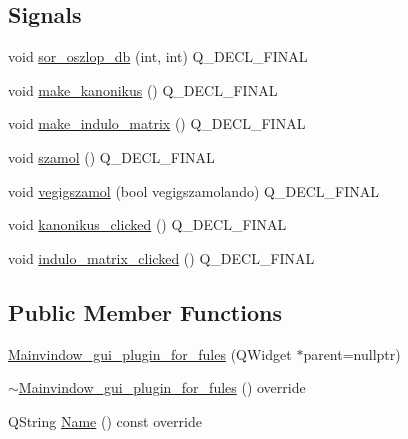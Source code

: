 \subsection*{Signals}
\begin{DoxyCompactItemize}
\item 
void \hyperlink{classMainvindow__gui__plugin__for__fules_a04e1668bac22f62c014954222d19f2ac}{sor\+\_\+oszlop\+\_\+db} (int, int) Q\+\_\+\+D\+E\+C\+L\+\_\+\+F\+I\+N\+AL
\item 
void \hyperlink{classMainvindow__gui__plugin__for__fules_ad57320bcd6e0f8353254601919b980b9}{make\+\_\+kanonikus} () Q\+\_\+\+D\+E\+C\+L\+\_\+\+F\+I\+N\+AL
\item 
void \hyperlink{classMainvindow__gui__plugin__for__fules_a69be0da66c49005cb7178c140b53dccb}{make\+\_\+indulo\+\_\+matrix} () Q\+\_\+\+D\+E\+C\+L\+\_\+\+F\+I\+N\+AL
\item 
void \hyperlink{classMainvindow__gui__plugin__for__fules_ab44bcc45064b346477fef5df26a119cc}{szamol} () Q\+\_\+\+D\+E\+C\+L\+\_\+\+F\+I\+N\+AL
\item 
void \hyperlink{classMainvindow__gui__plugin__for__fules_a080c54bd4e8e65ffcaacad58e900248a}{vegigszamol} (bool vegigszamolando) Q\+\_\+\+D\+E\+C\+L\+\_\+\+F\+I\+N\+AL
\item 
void \hyperlink{classMainvindow__gui__plugin__for__fules_a4ca08e417e9b4784db455ed9016870cc}{kanonikus\+\_\+clicked} () Q\+\_\+\+D\+E\+C\+L\+\_\+\+F\+I\+N\+AL
\item 
void \hyperlink{classMainvindow__gui__plugin__for__fules_a1b7701944f9234161efae2663b5c660f}{indulo\+\_\+matrix\+\_\+clicked} () Q\+\_\+\+D\+E\+C\+L\+\_\+\+F\+I\+N\+AL
\end{DoxyCompactItemize}
\subsection*{Public Member Functions}
\begin{DoxyCompactItemize}
\item 
\hyperlink{classMainvindow__gui__plugin__for__fules_aeb68fbca198b45e19deee3af31e550e5}{Mainvindow\+\_\+gui\+\_\+plugin\+\_\+for\+\_\+fules} (Q\+Widget $\ast$parent=nullptr)
\item 
\hyperlink{classMainvindow__gui__plugin__for__fules_a202c933c2c305081247fb1c334e1a020}{$\sim$\+Mainvindow\+\_\+gui\+\_\+plugin\+\_\+for\+\_\+fules} () override
\item 
Q\+String \hyperlink{classMainvindow__gui__plugin__for__fules_abfd45e12e05f78b189c4ad00f7fb6930}{Name} () const override
\end{DoxyCompactItemize}
